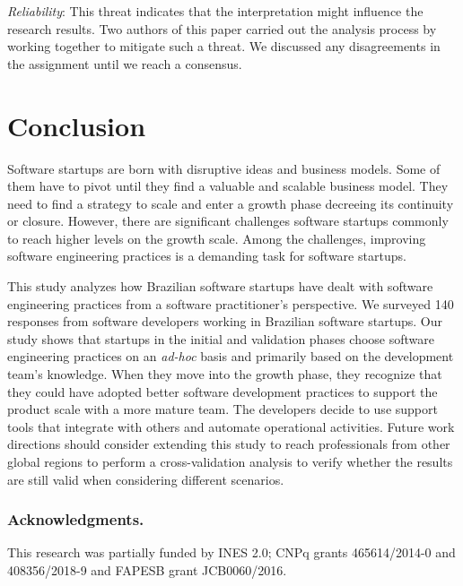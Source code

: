 \documentclass[runningheads]{llncs}
\begin{document}
\textit{Reliability}: This threat indicates that the interpretation might influence the research results. Two authors of this paper carried out the analysis process by working together to mitigate such a threat. We discussed any disagreements in the assignment until we reach a consensus.


\section{Conclusion} 
\label{section:conclusion}

Software startups are born with disruptive ideas and business models. Some of them have to pivot until they find a valuable and scalable business model. They need to find a strategy to scale and enter a growth phase decreeing its continuity or closure. However, there are significant challenges software startups commonly to reach higher levels on the growth scale. Among the challenges, improving software engineering practices is a demanding task for software startups.

This study analyzes how Brazilian software startups have dealt with software engineering practices from a software practitioner's perspective. We surveyed 140 responses from software developers working in Brazilian software startups. Our study shows that startups in the initial and validation phases choose software engineering practices on an \textit{ad-hoc} basis and primarily based on the development team's knowledge. When they move into the growth phase, they recognize that they could have adopted better software development practices to support the product scale with a more mature team. The developers decide to use support tools that integrate with others and automate operational activities. Future work directions should consider extending this study to reach professionals from other global regions to perform a cross-validation analysis to verify whether the results are still valid when considering different scenarios.


\subsubsection*{Acknowledgments.}
This research was partially funded by INES 2.0; CNPq grants 465614/2014-0 and 408356/2018-9 and FAPESB grant JCB0060/2016.
\end{document}

